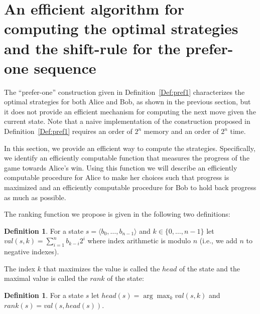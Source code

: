 \documentclass[final,12pt]{elsarticle}
\theoremstyle{definition} \newtheorem{definition}[theorem]{Definition} \newtheorem{observation}[theorem]{Observation} \newtheorem{example}[theorem]{Example} \newtheorem{remark}[theorem]{Remark} \newtheorem{corrolary}[theorem]{Corrolary}
\newcommand{\REF}[2]{#1~\ref{#2}}
\newcommand{\T}[1]{\langle{#1}\rangle} \DeclareMathOperator{\drop}{drop} \DeclareMathOperator{\dropbits}{drop\_bits} \DeclareMathOperator{\dropstates}{drop\_states} \DeclareMathOperator{\leadingForm}{LeadingForm} \DeclareMathOperator{\dv}{div} %
\begin{document}
\section{An efficient algorithm for computing the optimal strategies and the shift-rule for the prefer-one sequence}
\label{sec:efficient-optimal}

The ``prefer-one'' construction given in \REF{Definition}{Def:pref1} characterizes the optimal strategies for both Alice and Bob, as shown in the previous section, but it does not provide an efficient mechanism for computing the next move given the current state. Note that a naive implementation of the construction proposed in \REF{Definition}{Def:pref1} requires an order of $2^n$ memory and an order of $2^n$ time. 

In this section, we provide an efficient way to compute the strategies. Specifically, we identify an efficiently computable function that measures the progress of the game towards Alice's win. Using this function we will describe an efficiently computable procedure for Alice to make her choices such that progress is maximized and an efficiently computable procedure for Bob to hold back progress as much as possible.

The ranking function we propose is given in the following two definitions:

\begin{definition}
	For a state $s=\T{b_0,\dots,b_{n-1}}$ and $k \in \{0,\dots,n-1\}$ let  $val(s,k)=\sum_{i=1}^{n}  b_{k-i} 2^i$ where index arithmetic is modulo $n$ (i.e., we add $n$ to negative indexes).
\end{definition}
The index $k$ that maximizes the value is called the $head$ of the state and the maximal value is called the $rank$ of the state:
\begin{definition}
	For a state $s$ let  $head(s)=\arg \max_k val(s,k)$ and $rank(s)=val(s,head(s))$.
\end{definition}
\end{document}
